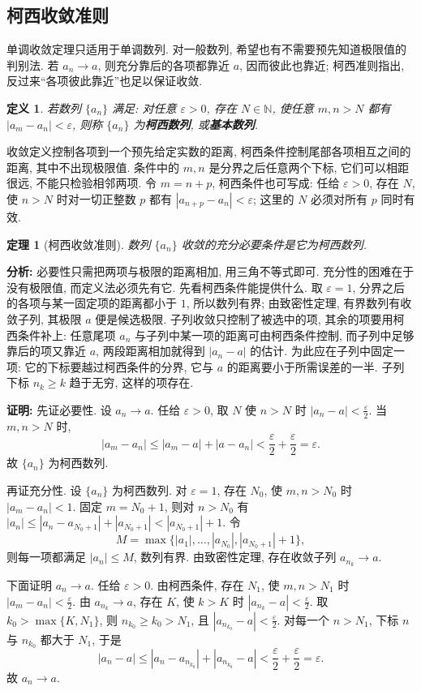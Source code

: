 \documentclass[UTF8,openany]{ctexbook}
\theoremstyle{chinesetextbook}
\newtheorem{definition}{定义}[section]
\newtheorem{theorem}{定理}[section]
\newenvironment{cnproof}{\par\indent\textbf{证明:} \ignorespaces}{\par}
\begin{document}
\subsection{柯西收敛准则}
单调收敛定理只适用于单调数列. 对一般数列, 希望也有不需要预先知道极限值的判别法. 若 $a_n\to a$, 则充分靠后的各项都靠近 $a$, 因而彼此也靠近; 柯西准则指出, 反过来“各项彼此靠近”也足以保证收敛.
\begin{definition}
若数列 $\{a_n\}$ 满足: 对任意 $\varepsilon>0$, 存在 $N\in\mathbb N$, 使任意 $m,n>N$ 都有 $|a_m-a_n|<\varepsilon$, 则称 $\{a_n\}$ 为\textbf{柯西数列}, 或\textbf{基本数列}.
\end{definition}
收敛定义控制各项到一个预先给定实数的距离, 柯西条件控制尾部各项相互之间的距离, 其中不出现极限值. 条件中的 $m,n$ 是分界之后任意两个下标, 它们可以相距很远, 不能只检验相邻两项. 令 $m=n+p$, 柯西条件也可写成: 任给 $\varepsilon>0$, 存在 $N$, 使 $n>N$ 时对一切正整数 $p$ 都有 $|a_{n+p}-a_n|<\varepsilon$; 这里的 $N$ 必须对所有 $p$ 同时有效.
\begin{theorem}[柯西收敛准则]
数列 $\{a_n\}$ 收敛的充分必要条件是它为柯西数列.
\end{theorem}
\par\indent\textbf{分析:} 必要性只需把两项与极限的距离相加, 用三角不等式即可. 充分性的困难在于没有极限值, 而定义法必须先有它. 先看柯西条件能提供什么. 取 $\varepsilon=1$, 分界之后的各项与某一固定项的距离都小于 $1$, 所以数列有界; 由致密性定理, 有界数列有收敛子列, 其极限 $a$ 便是候选极限. 子列收敛只控制了被选中的项, 其余的项要用柯西条件补上: 任意尾项 $a_n$ 与子列中某一项的距离可由柯西条件控制, 而子列中足够靠后的项又靠近 $a$, 两段距离相加就得到 $|a_n-a|$ 的估计. 为此应在子列中固定一项: 它的下标要越过柯西条件的分界, 它与 $a$ 的距离要小于所需误差的一半. 子列下标 $n_k\ge k$ 趋于无穷, 这样的项存在.
\begin{cnproof}
先证必要性. 设 $a_n\to a$. 任给 $\varepsilon>0$, 取 $N$ 使 $n>N$ 时 $\displaystyle|a_n-a|<\frac\varepsilon2$. 当 $m,n>N$ 时,
\[
|a_m-a_n|\le|a_m-a|+|a-a_n|<\frac\varepsilon2+\frac\varepsilon2=\varepsilon.
\]
故 $\{a_n\}$ 为柯西数列.

再证充分性. 设 $\{a_n\}$ 为柯西数列. 对 $\varepsilon=1$, 存在 $N_0$, 使 $m,n>N_0$ 时 $|a_m-a_n|<1$. 固定 $m=N_0+1$, 则对 $n>N_0$ 有 $|a_n|\le|a_n-a_{N_0+1}|+|a_{N_0+1}|<|a_{N_0+1}|+1$. 令
\[
M=\max\{|a_1|,\ldots,|a_{N_0}|,|a_{N_0+1}|+1\},
\]
则每一项都满足 $|a_n|\le M$, 数列有界. 由致密性定理, 存在收敛子列 $a_{n_k}\to a$.

下面证明 $a_n\to a$. 任给 $\varepsilon>0$. 由柯西条件, 存在 $N_1$, 使 $m,n>N_1$ 时 $\displaystyle|a_m-a_n|<\frac\varepsilon2$. 由 $a_{n_k}\to a$, 存在 $K$, 使 $k>K$ 时 $\displaystyle|a_{n_k}-a|<\frac\varepsilon2$. 取 $k_0>\max\{K,N_1\}$, 则 $n_{k_0}\ge k_0>N_1$, 且 $\displaystyle|a_{n_{k_0}}-a|<\frac\varepsilon2$. 对每一个 $n>N_1$, 下标 $n$ 与 $n_{k_0}$ 都大于 $N_1$, 于是
\[
|a_n-a|\le|a_n-a_{n_{k_0}}|+|a_{n_{k_0}}-a|<\frac\varepsilon2+\frac\varepsilon2=\varepsilon.
\]
故 $a_n\to a$.
\end{cnproof}
\end{document}
